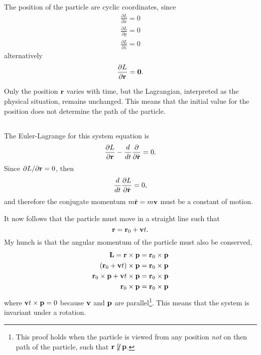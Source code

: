 \documentclass[11pt]{amsart}
\begin{document}
\subsection{}
The position of the particle are cyclic coordinates, since
\begin{align*}
\frac{\partial L}{\partial x} = 0 \\
\frac{\partial L}{\partial y} = 0 \\
\frac{\partial L}{\partial z} = 0 
\end{align*}
alternatively
\begin{equation}
\frac{\partial L}{\partial \vb{r}} = \vb{0}.
\end{equation}

Only the position $\vb{r}$ varies with time, but the Lagrangian, interpreted as the physical situation, remains unchanged. This means that the initial value for the position does not determine the path of the particle. 

\subsection{}
The Euler-Lagrange for this system equation is
\begin{equation}
\frac{\partial L}{\partial \vb{r}} - \frac{d}{dt}\frac{\partial}{\partial\dot{\vb{r}}} = 0.
\end{equation}
Since $\partial L / \partial \vb{r} = 0$, then
\begin{equation*}
\frac{d}{dt}\frac{\partial L}{\partial \dot{\vb{r}}} = 0,
\end{equation*}
and therefore the conjugate momentum $m\dot{\vb{r}}=m\vb{v}$ must be a constant of motion.

It now follows that the particle must move in a straight line such that
\begin{equation}
\vb{r} = \vb{r}_0 + \vb{v}t.
\end{equation}
My hunch is that the angular momentum of the particle must also be conserved,
\begin{align*}
\vb{L} = \vb{r} \times \vb{p} &= \vb{r}_0 \times \vb{p} \\
(\vb{r}_0 + \vb{v}t) \times \vb{p} &= \vb{r}_0 \times \vb{p} \\
\vb{r}_0 \times \vb{p} + \vb{v}t \times \vb{p} &= \vb{r}_0 \times \vb{p} \\
\vb{r}_0 \times \vb{p} &= \vb{r}_0 \times \vb{p}
\end{align*}
where $\vb{v}t \times \vb{p} = 0$ because $\vb{v}$ and $\vb{p}$ are parallel\footnote{This proof holds when the particle is viewed from any position \emph{not} on then path of the particle, such that $\vb{r} \not\parallel \vb{p}$.}. This means that the system is invariant under a rotation.
\end{document}

